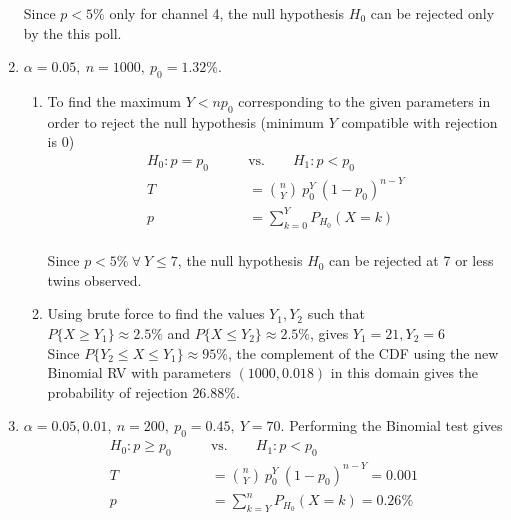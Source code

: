 \begin{enumerate}
	Since $ p < 5\% $ only for channel 4, the null hypothesis $ H_0 $ can be rejected only by the this poll.\\
	
	\item $\alpha = 0.05,\ n = 1000,\ p_0 = 1.32\%$.\\
	
	\begin{enumerate}
		
		\item To find the maximum $ Y < np_0$ corresponding to the given parameters in order to reject the null hypothesis (minimum $ Y $ compatible with rejection is $ 0 $)
		\begin{align}
			H_0 : p = p_0 \qquad &\text{vs.} \qquad H_1 : p < p_0 \nonumber \\
			T &= \binom{n}{Y}\ p_0^Y\ (1-p_0)^{n-Y}  \nonumber \\
			p &= \sum\limits_{k = 0}^{Y} P_{H_0}(X = k)
		\end{align}\\
	
		Since $ p < 5\%\ \forall\ Y \leq 7 $, the null hypothesis $ H_0 $ can be rejected at 7 or less twins observed.\\
		
		\item Using brute force to find the values $ Y_1, Y_2 $ such that \\
		$ P\{X \geq Y_1\} \approx 2.5\% $ and $ P\{X \leq Y_2\} \approx 2.5\% $, gives $ Y_1 = 21, Y_2 = 6 $\\
		
		Since $ P\{Y_2 \leq X \leq Y_1\} \approx 95\%$, the complement of the CDF using the new Binomial RV with parameters $ (1000, 0.018) $ in this domain gives the probability of rejection $ 26.88\% $.
		
		
	\end{enumerate}
	
	
	\item $\alpha = 0.05, 0.01,\ n = 200,\ p_0 = 0.45,\ Y = 70$. Performing the Binomial test gives\\
	
	\begin{align}
		H_0 : p  \geq p_0 \qquad &\text{vs.} \qquad H_1 : p < p_0 \nonumber \\
		T &= \binom{n}{Y}\ p_0^Y\ (1-p_0)^{n-Y}  = 0.001 \nonumber \\
		p &= \sum\limits_{k = Y}^{n} P_{H_0}(X = k) = 0.26\%
	\end{align}\\
	

\end{enumerate}
